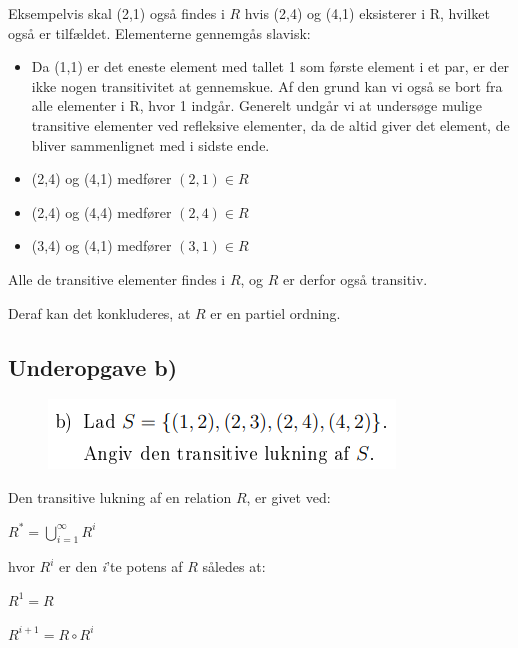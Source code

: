\documentclass{article}
\begin{document}
Eksempelvis skal (2,1) også findes i $R$ hvis (2,4) og (4,1) eksisterer i R, hvilket også er tilfældet. Elementerne gennemgås slavisk:

\begin{itemize}
\item Da (1,1) er det eneste element med tallet 1 som første element i et par, er der ikke nogen transitivitet at gennemskue. Af den grund kan vi også se bort fra alle elementer i R, hvor 1 indgår. Generelt undgår vi at undersøge mulige transitive elementer ved refleksive elementer, da de altid giver det element, de bliver sammenlignet med i sidste ende.
\item (2,4) og (4,1) medfører $(2,1) \in R$ \checkmark
\item (2,4) og (4,4) medfører $(2,4) \in R$ \checkmark
\item (3,4) og (4,1) medfører $(3,1) \in R$ \checkmark
\end{itemize}

Alle de transitive elementer findes i $R$, og $R$ er derfor også transitiv.

Deraf kan det konkluderes, at $R$ er en partiel ordning.

\subsection{Underopgave b)}

\begin{figure}[h]
\begin{center}
\includegraphics[scale=0.9]{2015Opgave3FormuleringB}
\end{center}
\end{figure}

Den transitive lukning af en relation $R$, er givet ved:

\begin{center}
\begin{math}
R^* = \bigcup_{i = 1}^\infty R^i
\end{math}
\end{center}

hvor $R^i$ er den \emph{i}'te potens af $R$ således at:

\begin{center}
$R^1 = R$
\end{center}
\begin{center}
$R^{i+1} = R \circ R^i$
\end{center}
\end{document}
